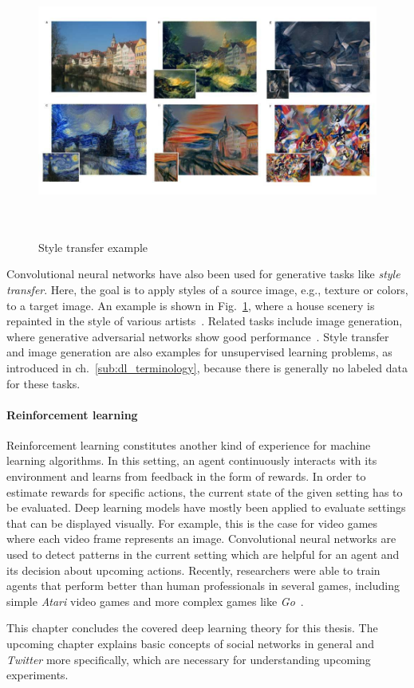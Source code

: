 \begin{figure}[h]
  \centering
  \includegraphics[height=9cm]{img/style_transfer.jpg}
  \caption[Style transfer example]{Style transfer example~\cite{Gatys2015}}
\label{fig:style_transfer}
\end{figure}

Convolutional neural networks have also been used for generative tasks like
\textit{style transfer}.
Here, the goal is to apply styles of a source image, e.g., texture or colors,
to a target image.
An example is shown in Fig.~\ref{fig:style_transfer}, where a house scenery is
repainted in the style of various artists~\cite{Gatys2015}.
Related tasks include image generation, where generative adversarial networks
show good performance~\cite{Radford2015}.
Style transfer and image generation are also examples for unsupervised learning
problems, as introduced in ch.~\ref{sub:dl_terminology}, because there is
generally no labeled data for these tasks.

\paragraph{Reinforcement learning}
\label{sub:dl_app_rl}

Reinforcement learning constitutes another kind of experience for machine
learning algorithms.
In this setting, an agent continuously interacts with its environment and learns
from feedback in the form of rewards.
In order to estimate rewards for specific actions, the current state of the
given setting has to be evaluated.
Deep learning models have mostly been applied to evaluate settings that can
be displayed visually.
For example, this is the case for video games where each video frame represents an image.
Convolutional neural networks are used to detect patterns in the current
setting which are helpful for an agent and its decision about upcoming
actions.
Recently, researchers were able to train agents that perform better than human
professionals in several games, including simple \textit{Atari} video games
and more complex games like \textit{Go}~\cite{Mnih2015, Silver2016}.

This chapter concludes the covered deep learning theory for this thesis.
The upcoming chapter explains basic concepts of social networks in general and
\textit{Twitter} more specifically, which are necessary for understanding
upcoming experiments.
